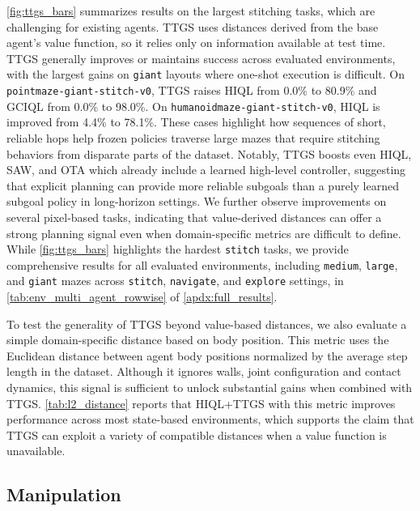 \documentclass{article} %
\begin{document}
\autoref{fig:ttgs_bars} summarizes results on the largest stitching tasks, which are challenging for existing agents. TTGS uses distances derived from the base agent’s value function, so it relies only on information available at test time. TTGS generally improves or maintains success across evaluated environments, with the largest gains on \texttt{giant} layouts where one-shot execution is difficult. On \texttt{pointmaze-giant-stitch-v0}, TTGS raises HIQL from 0.0\% to 80.9\% and GCIQL from 0.0\% to 98.0\%. On \texttt{humanoidmaze-giant-stitch-v0}, HIQL is improved from 4.4\% to 78.1\%. These cases highlight how sequences of short, reliable hops help frozen policies traverse large mazes that require stitching behaviors from disparate parts of the dataset. Notably, TTGS boosts even HIQL, SAW, and OTA which already include a learned high-level controller, suggesting that explicit planning can provide more reliable subgoals than a purely learned subgoal policy in long-horizon settings. We further observe improvements on several pixel-based tasks, indicating that value-derived distances can offer a strong planning signal even when domain-specific metrics are difficult to define. While \autoref{fig:ttgs_bars} highlights the hardest \texttt{stitch} tasks, we provide comprehensive results for all evaluated environments, including \texttt{medium}, \texttt{large}, and \texttt{giant} mazes across \texttt{stitch}, \texttt{navigate}, and \texttt{explore} settings, in \autoref{tab:env_multi_agent_rowwise} of \autoref{apdx:full_results}.

To test the generality of TTGS beyond value-based distances, we also evaluate a simple domain-specific distance based on body position. This metric uses the Euclidean distance between agent body positions normalized by the average step length in the dataset. Although it ignores walls, joint configuration and contact dynamics, this signal is sufficient to unlock substantial gains when combined with TTGS. \autoref{tab:l2_distance} reports that HIQL+TTGS with this metric improves performance across most state-based environments, which supports the claim that TTGS can exploit a variety of compatible distances when a value function is unavailable.

\subsection{Manipulation}\label{subsec:manipulation}
\end{document}
